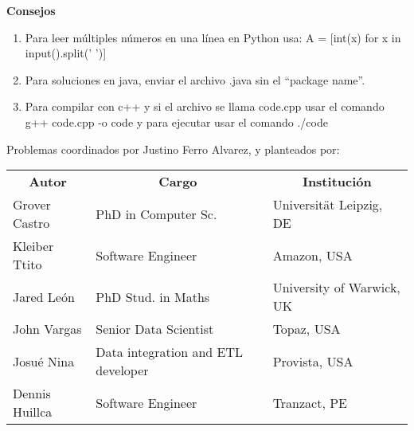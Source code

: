\textbf{Consejos}
\begin{enumerate}
    \item Para leer múltiples números en una línea en Python usa: A = [int(x) for x in input().split(' ')]
    \item Para soluciones en java, enviar el archivo .java sin el ``package name''.
    \item Para compilar con c++ y si el archivo se llama code.cpp usar el comando g++ code.cpp -o code y para ejecutar usar el comando ./code
\end{enumerate}

\begin{center}
    \vspace{1cm}
    Problemas coordinados por Justino Ferro Alvarez, y planteados por:
    \vspace{0.3cm}
    \begin{tabular}{ l l l}
        \multicolumn{1}{c}{\textbf{Autor}} & \multicolumn{1}{c}{\textbf{Cargo}} & \multicolumn{1}{c}{\textbf{Institución}}  \\
        Grover Castro & PhD in Computer Sc. & Universität Leipzig, DE\\
        Kleiber Ttito & Software Engineer & Amazon, USA \\
        Jared León & PhD Stud. in Maths & University of Warwick, UK\\
        John Vargas & Senior Data Scientist & Topaz, USA\\
        Josué Nina & Data integration and ETL developer & Provista, USA\\
        Dennis Huillca & Software Engineer & Tranzact, PE\\
    \end{tabular}
\end{center}
